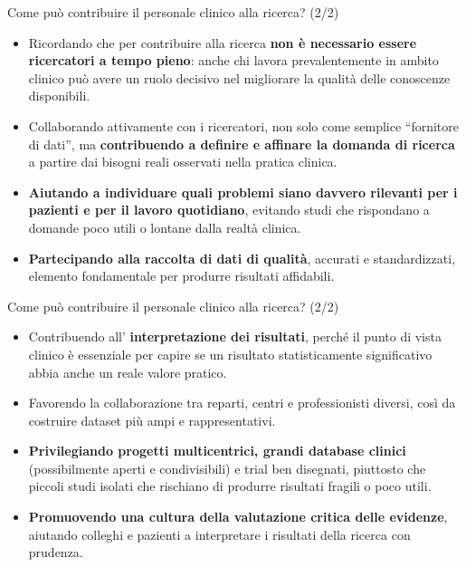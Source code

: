 \documentclass[
  ignorenonframetext,
]{beamer}
\begin{document}
\begin{frame}{\small Come può contribuire il personale clinico alla
ricerca? (2/2)}
\label{come-puuxf2-contribuire-il-personale-clinico-alla-ricerca-22}
\small

\begin{itemize}
\item
  Ricordando che per contribuire alla ricerca \textbf{non è necessario
  essere ricercatori a tempo pieno}: anche chi lavora prevalentemente in
  ambito clinico può avere un ruolo decisivo nel migliorare la qualità
  delle conoscenze disponibili.
\item
  Collaborando attivamente con i ricercatori, non solo come semplice
  ``fornitore di dati'', ma \textbf{contribuendo a definire e affinare
  la domanda di ricerca} a partire dai bisogni reali osservati nella
  pratica clinica.
\item
  \textbf{Aiutando a individuare quali problemi siano davvero rilevanti
  per i pazienti e per il lavoro quotidiano}, evitando studi che
  rispondano a domande poco utili o lontane dalla realtà clinica.
\item
  \textbf{Partecipando alla raccolta di dati di qualità}, accurati e
  standardizzati, elemento fondamentale per produrre risultati
  affidabili.
\end{itemize}
\end{frame}

\begin{frame}{\small Come può contribuire il personale clinico alla
ricerca? (2/2)}
\label{come-puuxf2-contribuire-il-personale-clinico-alla-ricerca-22-1}
\small

\begin{itemize}
\item
  Contribuendo all' \textbf{interpretazione dei risultati}, perché il
  punto di vista clinico è essenziale per capire se un risultato
  statisticamente significativo abbia anche un reale valore pratico.
\item
  Favorendo la collaborazione tra reparti, centri e professionisti
  diversi, così da costruire dataset più ampi e rappresentativi.
\item
  \textbf{Privilegiando progetti multicentrici, grandi database clinici}
  (possibilmente aperti e condivisibili) e trial ben disegnati,
  piuttosto che piccoli studi isolati che rischiano di produrre
  risultati fragili o poco utili.
\item
  \textbf{Promuovendo una cultura della valutazione critica delle
  evidenze}, aiutando colleghi e pazienti a interpretare i risultati
  della ricerca con prudenza.
\end{itemize}
\end{frame}
\end{document}
